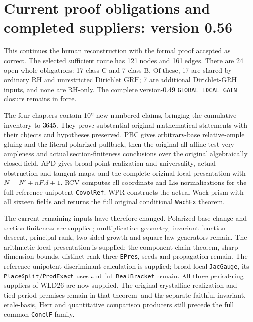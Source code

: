 \section{Current proof obligations and completed suppliers: version 0.56}
\label{sec:dependency-audit-v56}

This continues the human reconstruction with the formal proof accepted
as correct. The selected sufficient route has 121 nodes and 161 edges.
There are 24 open whole obligations: 17 class C and 7 class B.
Of these, 17 are shared by ordinary RH and unrestricted Dirichlet
GRH; 7 are additional Dirichlet-GRH inputs, and none are RH-only.
The complete version-0.49 \texttt{GLOBAL\_\allowbreak LOCAL\_\allowbreak GAIN} closure remains
in force.

The four chapters contain 107 new numbered claims, bringing the
cumulative inventory to 3645. They prove substantial original
mathematical statements with their objects and hypotheses preserved.
PBC gives arbitrary-base relative-ample gluing and the literal
polarized pullback, then the original all-affine-test very-ampleness
and actual section-finiteness conclusions over the original algebraically
closed field. APD gives broad point
realization and universality, actual obstruction and tangent maps,
and the complete original local presentation with
$N=N'+nF.d+1$. RCV computes all coordinate and Lie normalizations
for the full reference unipotent \texttt{Covol\allowbreak Ref}. WPR constructs
the actual Wach prism with all sixteen fields and returns the full
original conditional \texttt{Wach\allowbreak Ex} theorem.

The current remaining inputs have therefore changed. Polarized base
change and section finiteness are supplied; multiplication geometry,
invariant-function descent, principal rank, two-sided growth and
square-law generators remain. The arithmetic local presentation is
supplied; the component-chain theorem, sharp dimension bounds, distinct
rank-three \texttt{EPres}, seeds and propagation remain. The reference
unipotent discriminant calculation is supplied; broad local
\texttt{Jac\allowbreak Gauge}, its \texttt{Place\allowbreak Split}/\texttt{Prod\allowbreak Exact} uses
and full \texttt{Real\allowbreak Bracket} remain. All three period-ring suppliers
of WLD26 are now supplied. The original crystalline-realization and
tied-period premises remain in that theorem, and the separate
faithful-invariant, etale-basis, Herr and quantitative comparison
producers still precede the full common \texttt{Concl\allowbreak F} family.

